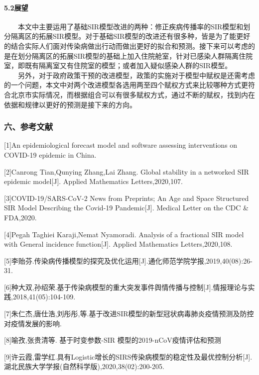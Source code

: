 \documentclass[12pt,a5paper,]{article}
\let\oldparagraph\paragraph
\renewcommand{\paragraph}[1]{\oldparagraph{#1}\mbox{}}
\begin{document}
\hypertarget{ux5c55ux671b}{%
\paragraph{5.2展望}\label{ux5c55ux671b}}

  本文中主要运用了基础SIR模型改进的两种：修正疾病传播率的SIR模型和划分隔离区的拓展SIR模型。对于基础SIR模型的改进还有很多种，皆是为了能更好的结合实际人们面对传染病做出行动而做出更好的拟合和预测。接下来可以考虑的是在划分隔离区的拓展SIR模型的基础上加入住院舱室，针对已感染人群隔离住院室，即既有隔离室又有住院室的模型；或者加入疑似感染人群的SIR模型。\\
  另外，对于政府政策干预的改进模型，政策的实施对于模型中赋权是还需考虑的一个问题，本文中对两个改进模型各选用两至四个赋权方式来比较哪种方式更符合北京市实际情况，而根据组合可以有很多赋权方式，通过不断的赋权，找到内在依据和规律以更好的预测是接下来的方向。

\hypertarget{ux516dux53c2ux8003ux6587ux732e}{%
\subsubsection{六、参考文献}\label{ux516dux53c2ux8003ux6587ux732e}}

{[}1{]}An epidemiological forecast model and software assessing
interventions on COVID-19 epidemic in China.

{[}2{]}Canrong Tian,Qunying Zhang,Lai Zhang. Global stability in a
networked SIR epidemic model{[}J{]}. Applied Mathematics
Letters,2020,107.

{[}3{]}COVID-19/SARS-CoV-2 News from Preprints; An Age and Space
Structured SIR Model Describing the Covid-19 Pandemic{[}J{]}. Medical
Letter on the CDC \& FDA,2020.

{[}4{]}Pegah Taghiei Karaji,Nemat Nyamoradi. Analysis of a fractional
SIR model with General incidence function{[}J{]}. Applied Mathematics
Letters,2020,108.

{[}5{]}李贻芬.传染病传播模型的探究及优化运用{[}J{]}.通化师范学院学报,2019,40(08):26-31.

{[}6{]}种大双,孙绍荣.基于传染病模型的重大突发事件舆情传播与控制{[}J{]}.情报理论与实践,2018,41(05):104-109.

{[}7{]}朱仁杰,唐仕浩,刘彤彤,等.基于改进SIR模型的新型冠状病毒肺炎疫情预测及防控对疫情发展的影响.

{[}8{]}喻孜,张贵清等. 基于时变参数-SIR 模型的2019-nCoV疫情评估和预测

{[}9{]}许云霞,雷学红.具有Logistic增长的SIRS传染病模型的稳定性及最优控制分析{[}J{]}.湖北民族大学学报(自然科学版),2020,38(02):200-205.
\end{document}
